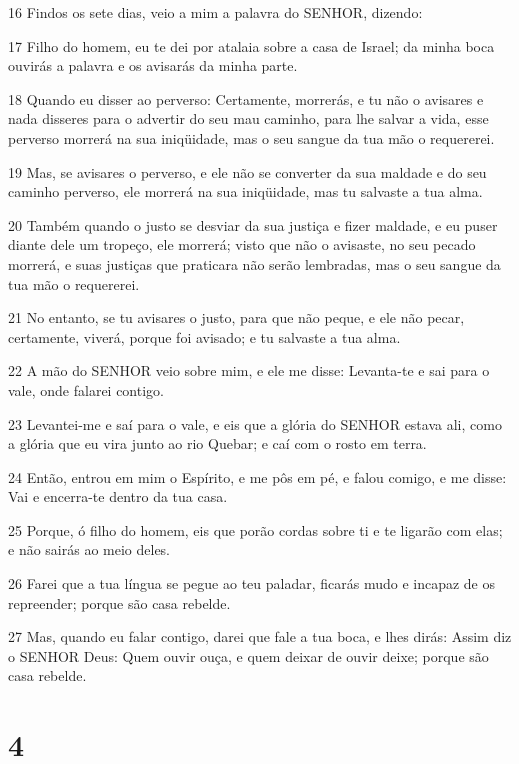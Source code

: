 \par 16 Findos os sete dias, veio a mim a palavra do SENHOR, dizendo:
\par 17 Filho do homem, eu te dei por atalaia sobre a casa de Israel; da minha boca ouvirás a palavra e os avisarás da minha parte.
\par 18 Quando eu disser ao perverso: Certamente, morrerás, e tu não o avisares e nada disseres para o advertir do seu mau caminho, para lhe salvar a vida, esse perverso morrerá na sua iniqüidade, mas o seu sangue da tua mão o requererei.
\par 19 Mas, se avisares o perverso, e ele não se converter da sua maldade e do seu caminho perverso, ele morrerá na sua iniqüidade, mas tu salvaste a tua alma.
\par 20 Também quando o justo se desviar da sua justiça e fizer maldade, e eu puser diante dele um tropeço, ele morrerá; visto que não o avisaste, no seu pecado morrerá, e suas justiças que praticara não serão lembradas, mas o seu sangue da tua mão o requererei.
\par 21 No entanto, se tu avisares o justo, para que não peque, e ele não pecar, certamente, viverá, porque foi avisado; e tu salvaste a tua alma.
\par 22 A mão do SENHOR veio sobre mim, e ele me disse: Levanta-te e sai para o vale, onde falarei contigo.
\par 23 Levantei-me e saí para o vale, e eis que a glória do SENHOR estava ali, como a glória que eu vira junto ao rio Quebar; e caí com o rosto em terra.
\par 24 Então, entrou em mim o Espírito, e me pôs em pé, e falou comigo, e me disse: Vai e encerra-te dentro da tua casa.
\par 25 Porque, ó filho do homem, eis que porão cordas sobre ti e te ligarão com elas; e não sairás ao meio deles.
\par 26 Farei que a tua língua se pegue ao teu paladar, ficarás mudo e incapaz de os repreender; porque são casa rebelde.
\par 27 Mas, quando eu falar contigo, darei que fale a tua boca, e lhes dirás: Assim diz o SENHOR Deus: Quem ouvir ouça, e quem deixar de ouvir deixe; porque são casa rebelde.

\chapter{4}

